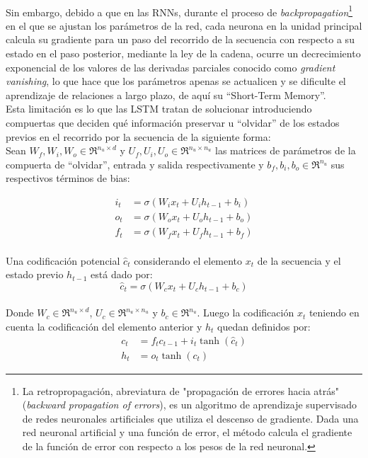 	\\
	Sin embargo, debido a que en las RNNs, durante el proceso de \textit{backpropagation}\footnote{La retropropagación, abreviatura de "propagación de errores hacia atrás" (\textit{backward propagation of errors}), es un algoritmo de aprendizaje supervisado de redes neuronales artificiales que utiliza el descenso de gradiente. Dada una red neuronal artificial y una función de error, el método calcula el gradiente de la función de error con respecto a los pesos de la red neuronal.} en el que se ajustan los parámetros de la red, cada neurona en la unidad principal calcula su gradiente para un paso del recorrido de la secuencia con respecto a su estado en el paso posterior, mediante la ley de la cadena, ocurre un decrecimiento exponencial de los valores de las derivadas parciales conocido como \textit{gradient vanishing}, lo que hace que los parámetros apenas se actualicen y se dificulte el aprendizaje de relaciones a largo plazo, de aquí su ``Short-Term Memory''.
	\\
	Esta limitación es lo que las LSTM tratan de solucionar introduciendo compuertas que deciden qué información preservar u ``olvidar'' de los estados previos en el recorrido por la secuencia de la siguiente forma:
	\\
	Sean $W_f, W_i, W_o \in \Re^{n_u\times d}$ y $U_f, U_i, U_o \in \Re^{n_u\times n_u}$ las matrices de parámetros de la compuerta de ``olvidar'', entrada y salida respectivamente y $b_f, b_i, b_o \in \Re^{n_u}$ sus respectivos términos de bias:
	
	\begin{equation}
		\begin{split}
		i_{t} &= \sigma(W_i x_t + U_i  h_{t-1} + b_i)\\
		o_{t} &= \sigma(W_o x_t + U_o h_{t-1} + b_o)\\
		f_t &= \sigma(W_{f} x_t + U_f   h_{t-1} + b_f) 
		\end{split}
		\label{lstm_gates}
	\end{equation}
	\\
	Una codificación potencial $\hat{c}_t$ considerando el elemento $x_t$ de la secuencia y el estado previo $h_{t-1}$ está dado por:
	\begin{equation}
		\hat{c}_{t} = \sigma(W_cx_t + U_c h_{t-1} + b_c)
		\label{lstm_pu}
	\end{equation}
	\\
	Donde $W_c\in\Re^{n_u\times d}$, $U_c\in\Re^{n_u\times n_u}$ y  $b_c\in\Re^{n_u}$. Luego la codificación $x_t$ teniendo en cuenta la codificación del elemento anterior y $h_t$ quedan definidos por:
	 \begin{equation}
	 	\begin{split}
	 		c_{t} &= f_tc_{t-1} +i_t\tanh(\hat{c}_{t})\\
	 		h_t &= o_t\tanh(c_t)
	 	\end{split}
	 	\label{lstm_hstate}
	 \end{equation}
 
